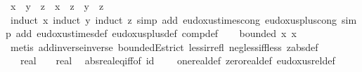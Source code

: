 \begin{isabellebody}
\ {\isachardoublequoteopen}{\isacharparenleft}{\kern0pt}x\ {\isacharplus}{\kern0pt}\ y{\isacharparenright}{\kern0pt}\ {\isacharasterisk}{\kern0pt}\ z\ {\isacharequal}{\kern0pt}\ x\ {\isacharasterisk}{\kern0pt}\ z\ {\isacharplus}{\kern0pt}\ y\ {\isacharasterisk}{\kern0pt}\ z{\isachardoublequoteclose}\ \isamarkupfalse%
\ {\isacharparenleft}{\kern0pt}induct\ x{\isacharcomma}{\kern0pt}\ induct\ y{\isacharcomma}{\kern0pt}\ induct\ z{\isacharparenright}{\kern0pt}\ {\isacharparenleft}{\kern0pt}simp\ add{\isacharcolon}{\kern0pt}\ eudoxus{\isacharunderscore}{\kern0pt}times{\isacharunderscore}{\kern0pt}cong\ eudoxus{\isacharunderscore}{\kern0pt}plus{\isacharunderscore}{\kern0pt}cong{\isacharcomma}{\kern0pt}\ simp\ add{\isacharcolon}{\kern0pt}\ eudoxus{\isacharunderscore}{\kern0pt}times{\isacharunderscore}{\kern0pt}def\ eudoxus{\isacharunderscore}{\kern0pt}plus{\isacharunderscore}{\kern0pt}def\ comp{\isacharunderscore}{\kern0pt}def{\isacharparenright}{\kern0pt}\isanewline
\ \ \isamarkupfalse%
\ {\isachardoublequoteopen}{\isasymnot}bounded\ {\isacharparenleft}{\kern0pt}{\isasymlambda}x{\isachardot}{\kern0pt}\ x{\isacharparenright}{\kern0pt}{\isachardoublequoteclose}\ \isamarkupfalse%
\ {\isacharparenleft}{\kern0pt}metis\ add{\isachardot}{\kern0pt}inverse{\isacharunderscore}{\kern0pt}inverse\ boundedE{\isacharunderscore}{\kern0pt}strict\ less{\isacharunderscore}{\kern0pt}irrefl\ neg{\isacharunderscore}{\kern0pt}less{\isacharunderscore}{\kern0pt}{}{\isacharunderscore}{\kern0pt}iff{\isacharunderscore}{\kern0pt}less\ zabs{\isacharunderscore}{\kern0pt}def{\isacharparenright}{\kern0pt}\isanewline
\ \ \isamarkupfalse%
\ {\isachardoublequoteopen}{\isacharparenleft}{\kern0pt}{}\ {\isacharcolon}{\kern0pt}{\isacharcolon}{\kern0pt}\ real{\isacharparenright}{\kern0pt}\ {\isasymnoteq}\ {\isacharparenleft}{\kern0pt}{}\ {\isacharcolon}{\kern0pt}{\isacharcolon}{\kern0pt}\ real{\isacharparenright}{\kern0pt}{\isachardoublequoteclose}\ \isamarkupfalse%
\ abs{\isacharunderscore}{\kern0pt}real{\isacharunderscore}{\kern0pt}eq{\isacharunderscore}{\kern0pt}iff{\isacharbrackleft}{\kern0pt}of\ id\ {\isachardoublequoteopen}{\isasymlambda}{\isacharunderscore}{\kern0pt}{\isachardot}{\kern0pt}\ {}{\isachardoublequoteclose}{\isacharbrackright}{\kern0pt}\ \isamarkupfalse%
\ one{\isacharunderscore}{\kern0pt}real{\isacharunderscore}{\kern0pt}def\ zero{\isacharunderscore}{\kern0pt}real{\isacharunderscore}{\kern0pt}def\ eudoxus{\isacharunderscore}{\kern0pt}rel{\isacharunderscore}{\kern0pt}def\ \isamarkupfalse%

\end{isabellebody}
